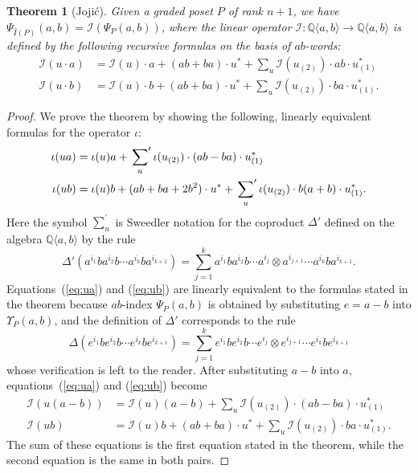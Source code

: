\documentclass[reqno,12pt]{amsart}
\numberwithin{equation}{section}
\newtheorem{theorem}{Theorem}[section]
\newcommand{\0}{\widehat{0}}
\newcommand{\1}{\widehat{1}}
\newcommand{\2}{\widehat{2}}
\newcommand{\grI}{\widehat{I}}
\newcommand{\iab}{\iota}
\newcommand{\Iab}{{\mathcal I}}
\begin{document}
\begin{theorem}[Joji\'{c}]
\label{thm:Jojicab}
Given a graded poset $P$ of rank $n+1$, we have
$\Psi_{\grI(P)}(a,b)=\Iab(\Psi_{P}(a,b))$, where the linear operator
$\Iab: {\mathbb Q}\langle a,b\rangle \rightarrow {\mathbb Q}\langle a,b\rangle$
is defined by the following recursive formulas on the basis of
$ab$-words:
\begin{align}
\Iab(u\cdot a)&=\Iab(u)\cdot a+(ab+ba)\cdot u^* +\sum_{u}
\Iab(u_{(2)})\cdot ab\cdot u_{(1)}^*\\
\Iab(u\cdot b)&=\Iab(u)\cdot b+(ab+ba)\cdot u^* +\sum_{u}
\Iab(u_{(2)})\cdot ba\cdot u_{(1)}^*.
\end{align}  
\end{theorem}
\begin{proof}
We prove the theorem by showing the following, linearly equivalent
formulas for the operator $\iab$:
\begin{align}
\label{eq:ua}
\iab(ua)&=\iab(u)a+\sideset{}{'}\sum_{u}\iab(u_{(2)})\cdot
(ab-ba)\cdot u_{(1)}^*\\
\label{eq:ub}
\iab(ub)&=\iab(u)b+(ab+ba+2b^2)\cdot
u^*+\sideset{}{'}\sum_{u}\iab(u_{(2)})\cdot b(a+b)\cdot u_{(1)}^*.
\end{align}  
Here the symbol $\sum_{u}^{\prime}$ is Sweedler notation for the coproduct
$\Delta'$ defined on the algebra ${\mathbb Q}\langle a,
b\rangle$ by the rule
$$
\Delta'(a^{i_1}ba^{i_2}b\cdots a^{i_k}ba^{i_{k+1}})
=\sum_{j=1}^k a^{i_1}ba^{i_2}b\cdots a^{i_j}\otimes
a^{i_{j+1}}\cdots a^{i_k}ba^{i_{k+1}}. 
$$
Equations~(\ref{eq:ua}) and (\ref{eq:ub}) are linearly equivalent to the
formulas stated in the theorem because
$ab$-index $\Psi_P(a,b)$ is obtained by substituting $e=a-b$ into
$\Upsilon_P(a,b)$, and the definition of $\Delta'$ corresponds to the
rule
$$
\Delta(e^{i_1}be^{i_2}b\cdots e^{i_k}be^{i_{k+1}})
=\sum_{j=1}^k e^{i_1}be^{i_2}b\cdots e^{i_j}\otimes
e^{i_{j+1}}\cdots e^{i_k}be^{i_{k+1}}
$$
whose verification is left to the reader. After substituting $a-b$ into
$a$,  equations~(\ref{eq:ua}) and (\ref{eq:ub}) become
\begin{align*}
\Iab(u(a-b))&=\Iab(u)(a-b)+\sum_{u}\Iab(u_{(2)})\cdot
(ab-ba)\cdot u_{(1)}^*\\
\Iab(ub)&=\Iab(u)b+(ab+ba)\cdot
u^*+\sum_{u}\Iab(u_{(2)})\cdot ba\cdot u_{(1)}^*.
\end{align*}  
The sum of these equations is the first equation stated in the theorem,
while the second equation is the same in both pairs.


\end{proof}
\end{document}
